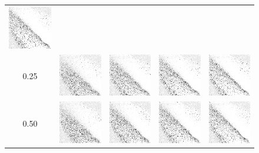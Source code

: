 \begin{figure}[h]
\begin{tabular}{c | c c c c}
			\includegraphics[width=2cm]{images/findings/experiments/decay/decay_010_1mm.png} \\ %
		0.25 & 
			\includegraphics[width=2cm]{images/findings/experiments/decay/decay_025_250.png} & %
			\includegraphics[width=2cm]{images/findings/experiments/decay/decay_025_500.png} & %
			\includegraphics[width=2cm]{images/findings/experiments/decay/decay_025_750.png} & %
			\includegraphics[width=2cm]{images/findings/experiments/decay/decay_025_1mm.png} \\ %
		0.50 & 
			\includegraphics[width=2cm]{images/findings/experiments/decay/decay_050_250.png} & %
			\includegraphics[width=2cm]{images/findings/experiments/decay/decay_050_500.png} & %
			\includegraphics[width=2cm]{images/findings/experiments/decay/decay_050_750.png} & %
			\includegraphics[width=2cm]{images/findings/experiments/decay/decay_050_1mm.png} \\ %
	\end{tabular}


\end{figure}
